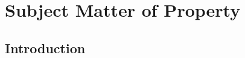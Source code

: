 \chapter{Subject Matter of Property}



\section{Introduction}







\begin{questions}

\end{questions}
